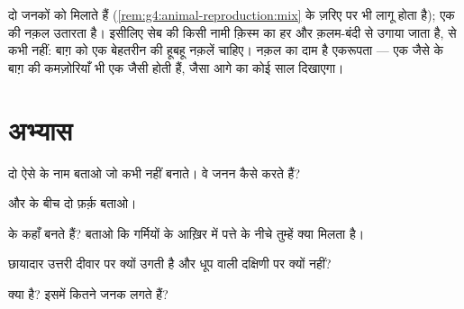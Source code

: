 \begin{remark}[एक जनक, हूबहू नक़लें]\label{rem:g4:plants-without-seeds:copy}
 दो जनकों को मिलाते हैं
(\cref{rem:g4:animal-reproduction:mix}  के ज़रिए  पर भी लागू
होता है);  एक की नक़ल उतारता है। इसीलिए सेब की किसी नामी क़िस्म
का हर   और क़लम-बंदी से उगाया जाता है,  से कभी नहीं: बाग़
को एक बेहतरीन  की हूबहू नक़लें चाहिए। नक़ल का दाम है एकरूपता ---
एक जैसे  के बाग़ की कमज़ोरियाँ भी एक जैसी होती हैं, जैसा आगे का
कोई साल दिखाएगा।
\end{remark}

\section{अभ्यास}

\begin{exercise}[$\star$]\label{exo:g4:plants-without-seeds:1}
दो ऐसे  के नाम बताओ जो कभी  नहीं बनाते। वे जनन कैसे करते हैं?
\end{exercise}

\begin{exercise}[$\star$]\label{exo:g4:plants-without-seeds:2}
 और  के बीच दो फ़र्क़ बताओ।
\end{exercise}

\begin{exercise}[$\star$]\label{exo:g4:plants-without-seeds:3}
 के  कहाँ बनते हैं? बताओ कि गर्मियों के आख़िर में पत्ते के
नीचे तुम्हें क्या मिलता है।
\end{exercise}

\begin{exercise}[$\star$]\label{exo:g4:plants-without-seeds:4}
 छायादार उत्तरी दीवार पर क्यों उगती है और धूप वाली दक्षिणी पर
क्यों नहीं?
\end{exercise}

\begin{exercise}[$\star$]\label{exo:g4:plants-without-seeds:5}
 क्या है? इसमें कितने जनक लगते हैं?
\end{exercise}


